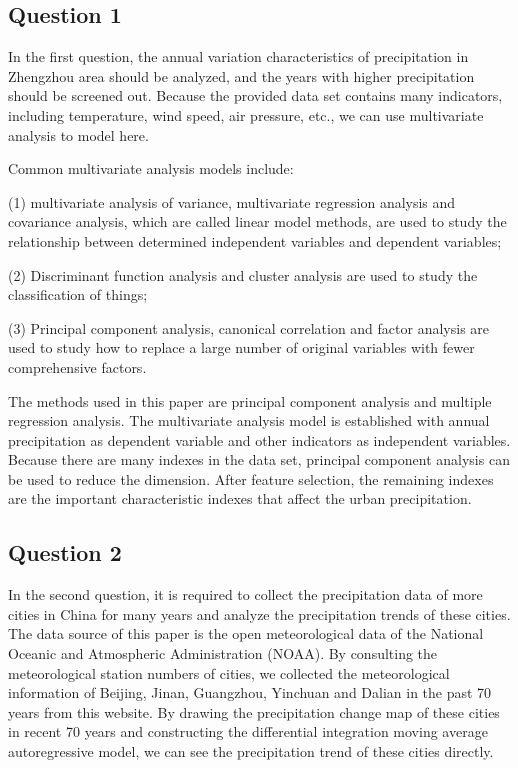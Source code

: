 \documentclass{swmcmthesis}
\begin{document}
\subsection{Question 1}
\hspace{1.25em}
In the first question, the annual variation characteristics of precipitation in Zhengzhou area should be analyzed, and the years with higher precipitation should be screened out. Because the provided data set contains many indicators, including temperature, wind speed, air pressure, etc., we can use multivariate analysis to model here.
\par
Common multivariate analysis models include:
\par 
(1) multivariate analysis of variance, multivariate regression analysis and covariance analysis, which are called linear model methods, are used to study the relationship between determined independent variables and dependent variables;
\par 
(2) Discriminant function analysis and cluster analysis are used to study the classification of things;
\par 
(3) Principal component analysis, canonical correlation and factor analysis are used to study how to replace a large number of original variables with fewer comprehensive factors.
\par 
The methods used in this paper are principal component analysis and multiple regression analysis. The multivariate analysis model is established with annual precipitation as dependent variable and other indicators as independent variables. Because there are many indexes in the data set, principal component analysis can be used to reduce the dimension. After feature selection, the remaining indexes are the important characteristic indexes that affect the urban precipitation.
\subsection{Question 2}
\hspace{1.25em}
In the second question, it is required to collect the precipitation data of more cities in China for many years and analyze the precipitation trends of these cities. The data source of this paper is the open meteorological data of the National Oceanic and Atmospheric Administration (NOAA). By consulting the meteorological station numbers of cities, we collected the meteorological information of Beijing, Jinan, Guangzhou, Yinchuan and Dalian in the past 70 years from this website. By drawing the precipitation change map of these cities in recent 70 years and constructing the differential integration moving average autoregressive model, we can see the precipitation trend of these cities directly.
\end{document}
